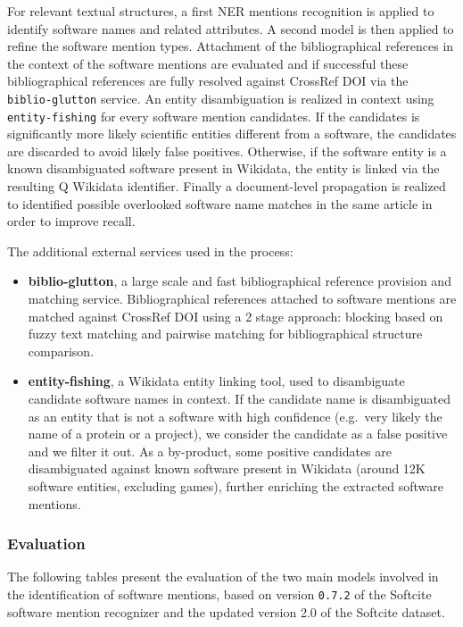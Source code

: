 \documentclass[
]{article}
\begin{document}
For relevant textual structures, a first NER mentions recognition is
applied to identify software names and related attributes. A second
model is then applied to refine the software mention types. Attachment
of the bibliographical references in the context of the software
mentions are evaluated and if successful these bibliographical
references are fully resolved against CrossRef DOI via the
\texttt{biblio-glutton} service. An entity disambiguation is realized in
context using \texttt{entity-fishing} for every software mention
candidates. If the candidates is significantly more likely scientific
entities different from a software, the candidates are discarded to
avoid likely false positives. Otherwise, if the software entity is a
known disambiguated software present in Wikidata, the entity is linked
via the resulting Q Wikidata identifier. Finally a document-level
propagation is realized to identified possible overlooked software name
matches in the same article in order to improve recall.

The additional external services used in the process:

\begin{itemize}
\item
  \textbf{biblio-glutton}, a large scale and fast bibliographical
  reference provision and matching service. Bibliographical references
  attached to software mentions are matched against CrossRef DOI using a
  2 stage approach: blocking based on fuzzy text matching and pairwise
  matching for bibliographical structure comparison.
\item
  \textbf{entity-fishing}, a Wikidata entity linking tool, used to
  disambiguate candidate software names in context. If the candidate
  name is disambiguated as an entity that is not a software with high
  confidence (e.g.~very likely the name of a protein or a project), we
  consider the candidate as a false positive and we filter it out. As a
  by-product, some positive candidates are disambiguated against known
  software present in Wikidata (around 12K software entities, excluding
  games), further enriching the extracted software mentions.
\end{itemize}

\hypertarget{evaluation}{%
\subsubsection{Evaluation}\label{evaluation}}

The following tables present the evaluation of the two main models
involved in the identification of software mentions, based on version
\texttt{0.7.2} of the Softcite software mention recognizer and the
updated version 2.0 of the Softcite dataset.
\end{document}
